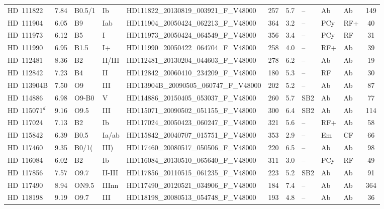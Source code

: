{\begin{landscape}
\begin{longtable}{lclllcclllc}
\noalign{\smallskip}
HD~111822 & 7.84 & B0.5/1 & Ib & HD111822\_20130819\_003921\_F\_V48000 & 257 & 5.7 & -- & Ab & Ab & 149 \\
\noalign{\smallskip}
HD~111904 & 6.05 & B9 & Iab & HD111904\_20050424\_062213\_F\_V48000 & 364 & 3.2 & -- & PCy & RF+ & 40 \\
\noalign{\smallskip}
HD~111973 & 6.12 & B5 & I & HD111973\_20050424\_064549\_F\_V48000 & 356 & 3.4 & -- & PCy & RF & 31 \\
\noalign{\smallskip}
HD~111990 & 6.95 & B1.5 & I+ & HD111990\_20050422\_064704\_F\_V48000 & 258 & 4.0 & -- & RF+ & Ab & 39 \\
\noalign{\smallskip}
HD~112481 & 8.36 & B2 & II/III & HD112481\_20130204\_044603\_F\_V48000 & 278 & 6.2 & -- & Ab & Ab & 19 \\
\noalign{\smallskip}
HD~112842 & 7.23 & B4 & II & HD112842\_20060410\_234209\_F\_V48000 & 180 & 5.3 & -- & RF & Ab & 30 \\
\noalign{\smallskip}
HD~113904B & 7.50 & O9 & III & HD113904B\_20090505\_060747\_F\_V48000 & 202 & 5.2 & -- & Ab & Ab & 87 \\
\noalign{\smallskip}
HD~114886 & 6.98 & O9-B0 & V & HD114886\_20150405\_053037\_F\_V48000 & 260 & 5.7 & SB2 & Ab & Ab & 77 \\
\noalign{\smallskip}
HD~115071$^{d}$ & 9.16 & O9.5 & III & HD115071\_20090502\_051155\_F\_V48000 & 300 & 6.4 & SB2 & Ab & Ab & 114 \\
\noalign{\smallskip}
HD~117024 & 7.13 & B2 & Ib & HD117024\_20050423\_060247\_F\_V48000 & 321 & 5.6 & -- & RF+ & Ab & 58 \\
\noalign{\smallskip}
HD~115842 & 6.39 & B0.5 & Ia/ab & HD115842\_20040707\_015751\_F\_V48000 & 353 & 2.9 & -- & Em & CF & 66 \\
\noalign{\smallskip}
HD~117460 & 9.35 & B0/1( & III) & HD117460\_20080517\_050506\_F\_V48000 & 220 & 6.5 & -- & Ab & Ab & 98 \\
\noalign{\smallskip}
HD~116084 & 6.02 & B2 & Ib & HD116084\_20130510\_065640\_F\_V48000 & 311 & 3.0 & -- & PCy & RF & 49 \\
\noalign{\smallskip}
HD~117856 & 7.57 & O9.7 & II-III & HD117856\_20110515\_061235\_F\_V48000 & 223 & 5.2 & SB2 & Ab & Ab & 91 \\
\noalign{\smallskip}
HD~117490 & 8.94 & ON9.5 & IIInn & HD117490\_20120521\_034906\_F\_V48000 & 184 & 7.4 & -- & Ab & Ab & 364 \\
\noalign{\smallskip}
HD~118198 & 9.19 & O9.7 & III & HD118198\_20080513\_054748\_F\_V48000 & 193 & 4.8 & -- & Ab & Ab & 36 \\

\end{longtable}
\end{landscape}}
